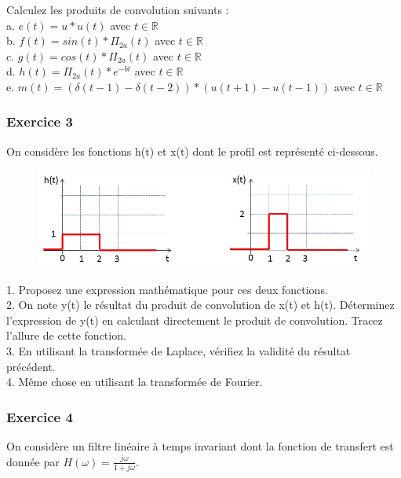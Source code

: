 	Calculez les produits de convolution suivants : \\
	a. $e(t)=u*u(t)$ avec $t \in \mathbb{R}$\\
	b. $f(t)=sin(t)*\Pi_{2a}(t)$ avec $t \in \mathbb{R}$\\
	c. $g(t)=cos(t)*\Pi_{2a}(t)$ avec $t \in \mathbb{R}$\\
	d. $h(t)=\Pi_{2a}(t)*e^{-bt}$ avec $t \in \mathbb{R}$\\
	e. $m(t)=(\delta(t-1)-\delta(t-2))*(u(t+1)-u(t-1))$ avec $t \in \mathbb{R}$\\
	
	\subsubsection{Exercice 3}
	
	On considère les fonctions h(t) et x(t) dont le profil est représenté ci-dessous.\\
	\begin{figure}[h!]
		\centering
		\includegraphics[scale=0.5]{images/Courbes_TD_Convolution_2.jpg} 
	\end{figure}
	
	1. Proposez une expression mathématique pour ces deux fonctions.\\
	
	2. On note y(t) le résultat du produit de convolution de x(t) et h(t). Déterminez l'expression de y(t) en calculant directement le produit de convolution. Tracez l'allure de cette fonction.\\
	
	3. En utilisant la transformée de Laplace, vérifiez la validité du résultat précédent.\\
	
	4. Même chose en utilisant la transformée de Fourier.\\
	
	\subsubsection{Exercice 4}
	On considère un filtre linéaire à temps invariant dont la fonction de transfert est donnée par $H(\omega)=\frac{j\omega}{1+j\omega}$. \\
	
